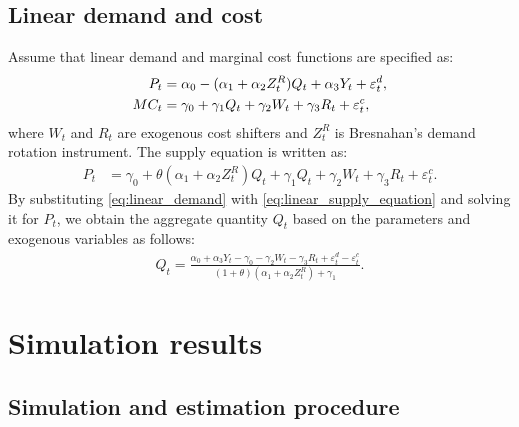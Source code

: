 \documentclass[11pt, a4paper]{article}
\begin{document}
\subsection{Linear demand and cost}
Assume that linear demand and marginal cost functions are specified as:
\begin{align}
    P_{t} &= \alpha_0 - (\alpha_1 + \alpha_2Z^{R}_{t})Q_{t} + \alpha_3 Y_{t} + \varepsilon^{d}_{t},\label{eq:linear_demand}\\
    MC_{t} &= \gamma_0  + \gamma_1 Q_{t} + \gamma_2 W_{t} + \gamma_3 R_{t} + \varepsilon^{c}_{t},\label{eq:linear_{t}arginal_cost}
\end{align}
where $W_{t}$ and $R_{t}$ are exogenous cost shifters and $Z^{R}_{t}$ is Bresnahan's demand rotation instrument. 
The supply equation is written as:
\begin{align}
    P_{t} 
    &= \gamma_0 + \theta (\alpha_1 + \alpha_2 Z^{R}_{t})Q_{t} + \gamma_1 Q_{t} + \gamma_2 W_{t} + \gamma_3 R_{t} +\varepsilon^c_{t}.\label{eq:linear_supply_equation}\end{align}
By substituting \eqref{eq:linear_demand} with \eqref{eq:linear_supply_equation} and solving it for $P_{t}$, we obtain the aggregate quantity $Q_{t}$ based on the parameters and exogenous variables as follows:
\begin{align}
    Q_{t} =  \frac{\alpha_0 + \alpha_3 Y_{t} - \gamma_0 - \gamma_2 W_{t} - \gamma_3 R_{t} + \varepsilon^{d}_{t} - \varepsilon^{c}_{t}}{(1 + \theta) (\alpha_1 + \alpha_2 Z^{R}_{t}) + \gamma_1}.\label{eq:quantity_linear}
\end{align}


\section{Simulation results}\label{sec:results}

\subsection{Simulation and estimation procedure}
\end{document}

